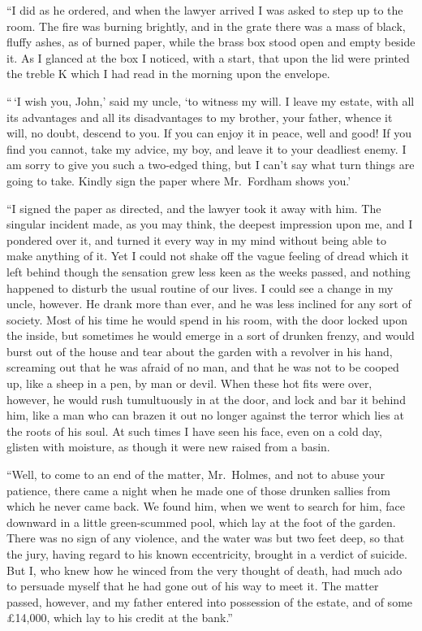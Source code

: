 “I did as he ordered, and when the lawyer arrived I was
asked to step up to the room. The fire was burning brightly,
and in the grate there was a mass of black, fluffy ashes, as of
burned paper, while the brass box stood open and empty beside
it. As I glanced at the box I noticed, with a start, that
upon the lid were printed the treble K which I had read in the
morning upon the envelope.

“\,‘I wish you, John,’ said my uncle, ‘to witness my will. I
leave my estate, with all its advantages and all its disadvantages
to my brother, your father, whence it will, no doubt, descend
to you. If you can enjoy it in peace, well and good!
If you find you cannot, take my advice, my boy, and leave it
to your deadliest enemy. I am sorry to give you such a two-edged
thing, but I can’t say what turn things are going to
take. Kindly sign the paper where Mr.~Fordham shows you.’

“I signed the paper as directed, and the lawyer took it
away with him. The singular incident made, as you may
think, the deepest impression upon me, and I pondered over
it, and turned it every way in my mind without being able to
make anything of it. Yet I could not shake off the vague
feeling of dread which it left behind though the sensation
grew less keen as the weeks passed, and nothing happened to
disturb the usual routine of our lives. I could see a change
in my uncle, however. He drank more than ever, and he was
less inclined for any sort of society. Most of his time he
would spend in his room, with the door locked upon the inside,
but sometimes he would emerge in a sort of drunken
frenzy, and would burst out of the house and tear about the
garden with a revolver in his hand, screaming out that he was
afraid of no man, and that he was not to be cooped up, like a
sheep in a pen, by man or devil. When these hot fits were
over, however, he would rush tumultuously in at the door, and
lock and bar it behind him, like a man who can brazen it out
no longer against the terror which lies at the roots of his soul.
At such times I have seen his face, even on a cold day, glisten
with moisture, as though it were new raised from a
basin.

“Well, to come to an end of the matter, Mr.~Holmes, and
not to abuse your patience, there came a night when he made
one of those drunken sallies from which he never came back.
We found him, when we went to search for him, face downward
in a little green-scummed pool, which lay at the foot of
the garden. There was no sign of any violence, and the water
was but two feet deep, so that the jury, having regard to
his known eccentricity, brought in a verdict of suicide. But
I, who knew how he winced from the very thought of death,
had much ado to persuade myself that he had gone out of his
way to meet it. The matter passed, however, and my father
entered into possession of the estate, and of some £14,000,
which lay to his credit at the bank.”

